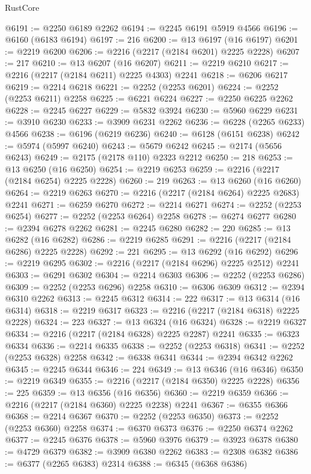 \begin{lexlean}{RustCore}
\begin{coremodule}
@6191 := @2250 @6189 @2262
@6194 := @2245 @6191 @5919 @4566
@6196 := @6160 (@6183 @6194)
@6197 := 216
@6200 := @13 @6197 (@16 @6197)
@6201 := @2219 @6200
@6206 := @2216 (@2217 (@2184 @6201) @2225 @2228)
@6207 := 217
@6210 := @13 @6207 (@16 @6207)
@6211 := @2219 @6210
@6217 := @2216 (@2217 (@2184 @6211) @2225 @4303) @2241
@6218 := @6206 @6217
@6219 := @2214 @6218
@6221 := @2252 (@2253 @6201)
@6224 := @2252 (@2253 @6211) @2258
@6225 := @6221 @6224
@6227 := @2250 @6225 @2262
@6228 := @2245 @6227
@6229 := @5832 @3924
@6230 := @5960 @6229
@6231 := @3910 @6230
@6233 := @3909 @6231 @2262
@6236 := @6228 (@2265 @6233) @4566
@6238 := @6196 (@6219 @6236)
@6240 := @6128 (@6151 @6238)
@6242 := @5974 (@5997 @6240)
@6243 := @5679 @6242
@6245 := @2174 (@5656 @6243)
@6249 := @2175 (@2178 @110) @2323 @2212
@6250 := 218
@6253 := @13 @6250 (@16 @6250)
@6254 := @2219 @6253
@6259 := @2216 (@2217 (@2184 @6254) @2225 @2228)
@6260 := 219
@6263 := @13 @6260 (@16 @6260)
@6264 := @2219 @6263
@6270 := @2216 (@2217 (@2184 @6264) @2225 @2683) @2241
@6271 := @6259 @6270
@6272 := @2214 @6271
@6274 := @2252 (@2253 @6254)
@6277 := @2252 (@2253 @6264) @2258
@6278 := @6274 @6277
@6280 := @2394 @6278 @2262
@6281 := @2245 @6280
@6282 := 220
@6285 := @13 @6282 (@16 @6282)
@6286 := @2219 @6285
@6291 := @2216 (@2217 (@2184 @6286) @2225 @2228)
@6292 := 221
@6295 := @13 @6292 (@16 @6292)
@6296 := @2219 @6295
@6302 := @2216 (@2217 (@2184 @6296) @2225 @2512) @2241
@6303 := @6291 @6302
@6304 := @2214 @6303
@6306 := @2252 (@2253 @6286)
@6309 := @2252 (@2253 @6296) @2258
@6310 := @6306 @6309
@6312 := @2394 @6310 @2262
@6313 := @2245 @6312
@6314 := 222
@6317 := @13 @6314 (@16 @6314)
@6318 := @2219 @6317
@6323 := @2216 (@2217 (@2184 @6318) @2225 @2228)
@6324 := 223
@6327 := @13 @6324 (@16 @6324)
@6328 := @2219 @6327
@6334 := @2216 (@2217 (@2184 @6328) @2225 @2287) @2241
@6335 := @6323 @6334
@6336 := @2214 @6335
@6338 := @2252 (@2253 @6318)
@6341 := @2252 (@2253 @6328) @2258
@6342 := @6338 @6341
@6344 := @2394 @6342 @2262
@6345 := @2245 @6344
@6346 := 224
@6349 := @13 @6346 (@16 @6346)
@6350 := @2219 @6349
@6355 := @2216 (@2217 (@2184 @6350) @2225 @2228)
@6356 := 225
@6359 := @13 @6356 (@16 @6356)
@6360 := @2219 @6359
@6366 := @2216 (@2217 (@2184 @6360) @2225 @2238) @2241
@6367 := @6355 @6366
@6368 := @2214 @6367
@6370 := @2252 (@2253 @6350)
@6373 := @2252 (@2253 @6360) @2258
@6374 := @6370 @6373
@6376 := @2250 @6374 @2262
@6377 := @2245 @6376
@6378 := @5960 @3976
@6379 := @3923 @6378
@6380 := @4729 @6379
@6382 := @3909 @6380 @2262
@6383 := @2308 @6382
@6386 := @6377 (@2265 @6383) @2314
@6388 := @6345 (@6368 @6386)

\end{coremodule}
\end{lexlean}
